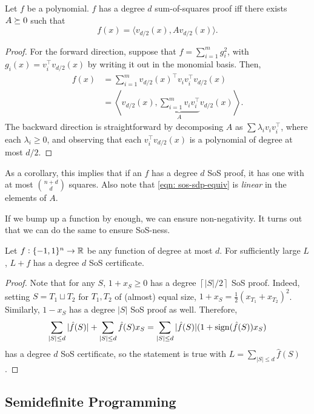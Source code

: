	\begin{fprop}
		\label{prop: sos-sdp-equiv}
		Let $f$ be a polynomial. $f$ has a degree $d$ sum-of-squares proof iff there exists $A \succeq 0$ such that
		\begin{equation}
			\label{eqn: sos-sdp-equiv}
			f(x) = \langle  v_{d/2}(x) , A v_{d/2}(x) \rangle.
		\end{equation}
	\end{fprop}
	\begin{proof}
		For the forward direction, suppose that $f = \sum_{i=1}^m g_i^2$, with $g_i(x) = v_i^\top v_{d/2}(x)$ by writing it out in the monomial basis. Then,
		\begin{align*}
			f(x) &= \sum_{i=1}^{m} v_{d/2}(x)^\top v_i v_i^\top v_{d/2}(x) \\
				&= \left\langle v_{d/2}(x) , \underbrace{\sum_{i=1}^m v_iv_i^\top}_{A} v_{d/2}(x) \right\rangle.
		\end{align*}
		The backward direction is straightforward by decomposing $A$ as $\sum \lambda_i v_i v_i^\top$, where each $\lambda_i \ge 0$, and observing that each $v_i^\top v_{d/2}(x)$ is a polynomial of degree at most $d/2$.
	\end{proof}
	As a corollary, this implies that if an $f$ has a degree $d$ SoS proof, it has one with at most $\binom{n+d}{d}$ squares.
	Also note that \cref{eqn: sos-sdp-equiv} is \emph{linear} in the elements of $A$.

	If we bump up a function by enough, we can ensure non-negativity. It turns out that we can do the same to ensure SoS-ness.
	\begin{flem}
		\label{lem:large-enough-sos}
		Let $f:\{-1,1\}^n \to \mathbb{R}$ be any function of degree at most $d$. For sufficiently large $L$, $L+f$ has a degree $d$ SoS certificate.
	\end{flem}
	\begin{proof}
		Note that for any $S$, $1+x_S \ge 0$ has a degree $\left\lceil|S|/2\right\rceil$ SoS proof. Indeed, setting $S = T_1 \sqcup T_2$ for $T_1,T_2$ of (almost) equal size, $1+x_S = \frac{1}{2}(x_{T_1} + x_{T_2})^2$. Similarly, $1-x_S$ has a degree $|S|$ SoS proof as well. Therefore,
		\[ \sum_{|S| \le d} |\hat{f}(S)| + \sum_{|S| \le d} \hat{f}(S) x_S = \sum_{|S| \le d} |\hat{f}(S)|(1 + \operatorname{sign}(\hat{f}(S))x_S) \]
		has a degree $d$ SoS certificate, so the statement is true with $L = \sum_{|S| \le d} \hat{f}(S)$.
	\end{proof}

\subsection{Semidefinite Programming}

